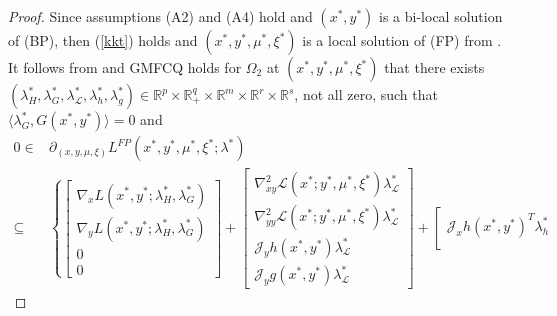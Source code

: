 \documentclass[11pt]{article}
\theoremstyle{definition}
\theoremstyle{remark}
\numberwithin{equation}{section}
\begin{document}
\begin{proof}
 Since assumptions \textnormal{(A2)} and \textnormal{(A4)} hold and $(x^*,y^*)$ is a bi-local solution of (BP), then (\ref{kkt}) holds and
  $(x^*,y^*,\mu^*,\xi^*)$ is a local solution of (FP) from \cite[Remark 3.6]{Liu 25}.
 It follows from \cite[Theorem 6.1.1]{Clarke} and
  GMFCQ holds for $\Omega_2$ at $(x^*,y^*,\mu^*,\xi^*)$ that
  there exists
$(\lambda_H^*,\lambda_G^*,\lambda_{\mathcal{L}}^*,\lambda_h^*,\lambda_g^*)
  \in\mathbb{R}^{p}\times\mathbb{R}_{+}^{q}\times\mathbb{R}^{m}
  \times\mathbb{R}^{r}\times\mathbb{R}^{s}$, not all zero, such that
   $\langle \lambda_{G}^*, G(x^*,y^*)\rangle= 0$ and
\begin{align*}
 0 \in& \partial_{(x,y,\mu,\xi)} L^{FP}(x^*,y^*,\mu^*,\xi^*;\lambda^*)\\
 \subseteq& \left\{\left[\begin{array}{c}
                \nabla_{x}L(x^*,y^*;\lambda_H^*,\lambda_G^*)
                  \\
               \nabla_{y}L(x^*,y^*;\lambda_H^*,\lambda_G^*)
                  \\
               0 \\
                0
              \end{array}\right]\right. +\left[\begin{array}{c}
                            \nabla_{xy}^2 \mathcal{L}(x^*;y^*,\mu^*,\xi^*)\lambda_{\mathcal{L}}^* \\
                            \nabla_{yy}^2 \mathcal{L}(x^*;y^*,\mu^*,\xi^*)\lambda_{\mathcal{L}}^* \\
                                                      \mathcal{J}_y h(x^*,y^*)\lambda_{\mathcal{L}}^* \\
                                                      \mathcal{J}_y g(x^*,y^*)\lambda_{\mathcal{L}}^*
                                                    \end{array}\right]
                                                    +\left[\begin{array}{c}
                         \mathcal{J}_x h(x^*,y^*)^T\lambda_h^* \\

\end{array}
\end{align*}
\end{proof}
\end{document}
